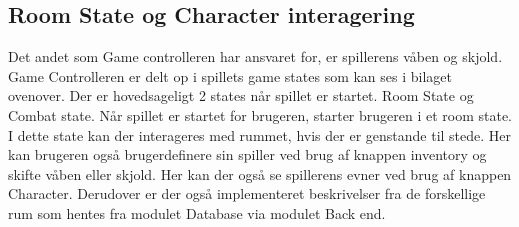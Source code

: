 \subsection{Room State og Character interagering}
Det andet som Game controlleren har ansvaret for, er spillerens våben og skjold. Game Controlleren er delt op i spillets game states som kan ses i bilaget ovenover. Der er hovedsageligt 2 states når spillet er startet. Room State og Combat state. Når spillet er startet for brugeren, starter brugeren i et room state. I dette state kan der interageres med rummet, hvis der er genstande til stede. Her kan brugeren også brugerdefinere sin spiller ved brug af knappen inventory og skifte våben eller skjold. Her kan der også se spillerens evner ved brug af knappen Character. Derudover er der også implementeret beskrivelser fra de forskellige rum som hentes fra modulet Database via modulet Back end.
